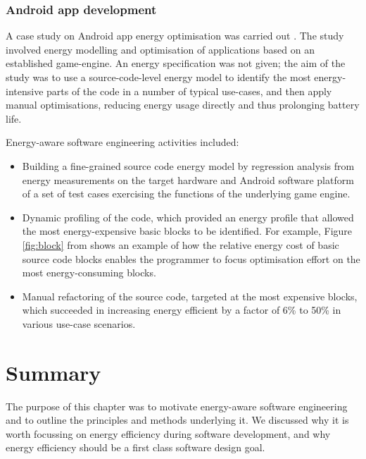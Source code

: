 \documentclass[oneside]{book}
\begin{document}
\subsubsection{Android app development}\label{android-scenario}

A case study on Android app energy optimisation was carried out \cite{LiGallagherSCAM2016}.  
The study involved  energy modelling and optimisation of applications based on an established game-engine.  
An energy specification was not given; the aim of the study was to use a source-code-level energy model to 
identify the most energy-intensive parts of the code in a number of typical use-cases, 
and then apply manual optimisations, reducing energy usage directly and thus prolonging battery life.

Energy-aware software engineering activities included:
\begin{itemize}
\item
Building a fine-grained source code energy model by regression
analysis from energy measurements on the target hardware and Android
software platform of a set of test cases exercising the functions of
the underlying game engine.

\item

Dynamic profiling of the code, which provided an energy profile that
allowed the most energy-expensive basic blocks to be identified. For example, Figure \ref{fig:block} 
from \cite{LiGallagherSCAM2016} shows an example of how the relative energy cost of
basic source code blocks enables the programmer to focus optimisation effort on the most energy-consuming
blocks.


\item Manual refactoring of the source code, targeted at the most
  expensive blocks, which succeeded in increasing energy efficient by
  a factor of 6\% to 50\% in various use-case scenarios.
\end{itemize}

\section{Summary}\label{sec:summary}

The purpose of this chapter was to motivate energy-aware software engineering and to outline the principles and methods underlying it.
We discussed why it is worth focussing on energy efficiency during software development, and why energy efficiency should be
a first class software design goal. 
\end{document}
